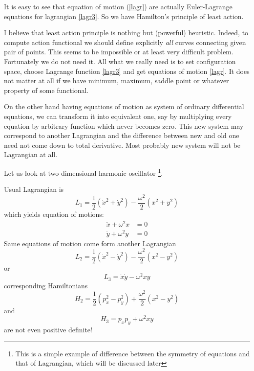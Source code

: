 It is easy to see that equation of motion (\ref{lagr}) are actually  Euler-Lagrange equations 
for lagrangian \eqref{lagr3}. 
So we have  Hamilton's principle of least action.


I believe that least action principle  is nothing but (powerful) heuristic. Indeed, to compute 
action functional we should define explicitly {\em all} curves connecting given pair of points.
This seems to be impossible or at least very difficult problem. Fortunately we do not need it.
All what we really need is to set configuration space, choose Lagrange function 
\eqref{lagr3} and get equations of motion \eqref{lagr}. It does not matter at all
if we have minimum, maximum, saddle point or whatever property of some functional.

On the other hand having equations of motion as system of ordinary differential equations,
we can transform it into equivalent one, say by multiplying every equation by arbitrary 
function which never becomes zero. This new system may correspond to another Lagrangian and
the difference between new and old one need not come down to total derivative. Most probably
new system will not be Lagrangian at all.

Let us look at two-dimensional harmonic oscillator
\footnote{This is a simple example of difference between the
symmetry of equations and that of Lagrangian, which will be discussed later}.

Usual Lagrangian is
\begin{equation}
   \label {ho1}
    L_1= \frac{1}{2} (\dot x^2+\dot y^2) -\frac{ \omega^2}{2} ( x^2+ y^2)
\end{equation}
which yields equation  of motions:
\begin{equation}
   \label {hoe1}
   \begin{split}
       \ddot x+ \omega^2 x & =0 \\
       \ddot y+ \omega^2 y & =0 
   \end{split}
\end{equation}
Same equations of motion come form 
another Lagrangian
\begin{equation}
   \label {ho2}
    L_2= \frac{1}{2} (\dot x^2-\dot y^2) -\frac{ \omega^2}{2} ( x^2- y^2)
\end{equation}
or
\begin{equation}
   \label {ho3}
    L_3= \dot x\dot y - \omega^2  x y
\end{equation}
corresponding  Hamiltonians 
\begin{equation}
   \label {ho2h}
    H_2= \frac{1}{2} ( p_x^2-p_y^2) +\frac{ \omega^2}{2} ( x^2- y^2)
\end{equation}
and
\begin{equation}
   \label {ho3h}
    H_3= p_x p_y +\omega^2  x y
\end{equation}
are not even positive definite!

